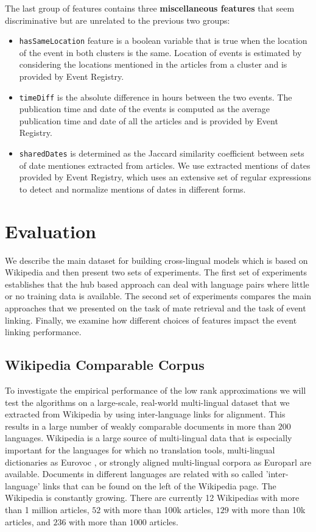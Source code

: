 \documentclass[twoside,11pt]{article}
\begin{document}
The last group of features contains three {\bf miscellaneous features} that seem discriminative but are unrelated to the previous two groups:
\begin{itemize}
\item \texttt{hasSameLocation} feature is a boolean variable that is true when the location of the event in both clusters is the same. Location of events is estimated by considering the locations mentioned in the articles from a cluster and is provided by Event Registry.
\item \texttt{timeDiff} is the absolute difference in hours between the two events. The publication time and date of the events is computed as the average publication time and date of all the articles and is provided by Event Registry.
\item \texttt{sharedDates} is determined as the Jaccard similarity coefficient between sets of date mentiones extracted from articles. We use extracted mentions of dates provided by Event Registry, which uses an extensive set of regular expressions to detect and normalize mentions of dates in different forms.
\end{itemize}


\section{Evaluation}

We describe the main dataset for building cross-lingual models which is based on Wikipedia and then present two sets of experiments. The first set of experiments
establishes that the hub based approach can deal with language pairs where little or no training data is available. The second set of experiments compares the main approaches
that we presented on the task of mate retrieval and the task of event linking. Finally, we examine how different choices of features impact the event linking performance.

\subsection{Wikipedia Comparable Corpus}

To investigate the empirical performance of the low rank approximations we will test the algorithms on a large-scale, real-world multi-lingual dataset that we extracted from Wikipedia by using inter-language links for alignment. This  results in a large number of weakly comparable documents in more than $200$ languages. Wikipedia is a large source of multi-lingual data that is especially important for the languages for which no translation tools, multi-lingual dictionaries as Eurovoc \cite{eurovoc}, or strongly aligned multi-lingual corpora as Europarl \cite{europarl} are available. Documents in different languages are related with so called 'inter-language' links that can be found on the left of the Wikipedia page. The Wikipedia is constantly growing. There are currently 12 Wikipedias with more than 1 million %
 articles, $52$ with more than 100k %
 articles, $129$ with more than 10k articles, and $236$ with more than $1000$ articles.
\end{document}
